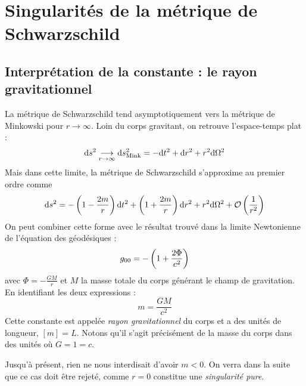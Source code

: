 \section{Singularités de la métrique de Schwarzschild}
\subsection{Interprétation de la constante : le rayon gravitationnel}
La métrique de Schwarzschild tend asymptotiquement vers la métrique de Minkowski pour $r \to \infty$. Loin du corps gravitant, on retrouve l'espace-temps plat :
\begin{equation}
    \mathrm{d} s^2 \underset{r \to \infty}{\longrightarrow} \mathrm{d} s^2_\text{Mink} = - \mathrm{d} t^2 + \mathrm{d} r^2 + r^2 \mathrm{d} \Omega^2
\end{equation}
Mais dans cette limite, la métrique de Schwarzschild s'approxime au premier ordre comme
\begin{equation}
    \mathrm{d} s^2 = - \left( 1 - \frac{2m}{r} \right) \mathrm{d} t^2 + \left( 1 + \frac{2m}{r} \right) \mathrm{d} r^2 + r^2 \mathrm{d} \Omega^2 + \mathcal{O}\left( \frac{1}{r^2} \right)
\end{equation}
On peut combiner cette forme avec le résultat trouvé dans la limite Newtonienne de l'équation des géodésiques :
\begin{equation}
    g_{00} = - \left( 1 + \frac{2 \Phi}{c^2} \right)
\end{equation}
avec $\Phi = -\frac{GM}{r}$ et $M$ la masse totale du corps générant le champ de gravitation. En identifiant les deux expressions :
\begin{equation}
    \boxed{m = \frac{GM}{c^2}}
\end{equation}
Cette constante est appelée \emph{rayon gravitationnel} du corps et a des unités de longueur, $[m] = L$. Notons qu'il s'agit précisément de la masse du corps dans des unités où $G = 1 =c$.
\begin{rmk}
    Jusqu'à présent, rien ne nous interdisait d'avoir $m<0$. On verra dans la suite que ce cas doit être rejeté, comme $r = 0$ constitue une \emph{singularité pure}.
\end{rmk}
